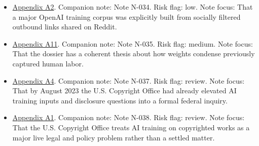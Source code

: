 \documentclass[
  american,
  11pt,
  letterpaper,
]{article}
\begin{document}
\begin{itemize}
\item
  \hyperref[appendix-a2-language-models-are-unsupervised-multitask-learners]{Appendix
  A2}. Companion note: Note N-034. Risk flag: low. Note focus: That a
  major OpenAI training corpus was explicitly built from socially
  filtered outbound links shared on Reddit.
\item
  \hyperref[appendix-a11-ai-copyright-weights-a-new-frontier-in-intellectual-property-law]{Appendix
  A11}. Companion note: Note N-035. Risk flag: medium. Note focus: That
  the dossier has a coherent thesis about how weights condense
  previously captured human labor.
\item
  \hyperref[appendix-a4-copyright-and-artificial-intelligence-notice-of-inquiry]{Appendix
  A4}. Companion note: Note N-037. Risk flag: review. Note focus: That
  by August 2023 the U.S. Copyright Office had already elevated AI
  training inputs and disclosure questions into a formal federal
  inquiry.
\item
  \hyperref[appendix-a1-copyright-and-artificial-intelligence-part-3-generative-ai-training-pre-publication-version]{Appendix
  A1}. Companion note: Note N-038. Risk flag: review. Note focus: That
  the U.S. Copyright Office treats AI training on copyrighted works as a
  major live legal and policy problem rather than a settled matter.
\end{itemize}
\end{document}
